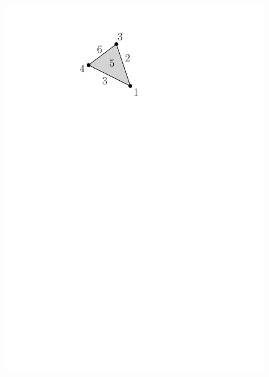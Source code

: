 \documentclass[11pt]{article}
\begin{document}
\begin{figure}
\centering
	\includegraphics[scale=0.65]{algebra.pdf}

\end{figure}
\end{document}
